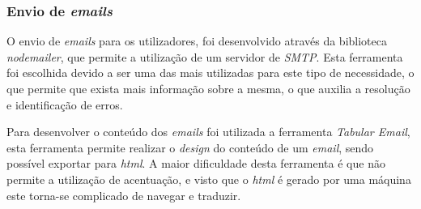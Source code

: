 \subsubsection{Envio de \textit{emails}}
O envio de \textit{emails} para os utilizadores, foi desenvolvido através da biblioteca \textit{nodemailer}, que permite a utilização de um servidor de \textit{SMTP}. Esta ferramenta foi escolhida devido a ser uma das mais utilizadas para este tipo de necessidade, o que permite que exista mais informação sobre a mesma, o que auxilia a resolução e identificação de erros. 

Para desenvolver o conteúdo dos \textit{emails} foi utilizada a ferramenta \textit{Tabular Email}, esta ferramenta permite realizar o \textit{design} do conteúdo de um \textit{email}, sendo possível exportar para \textit{html}. A maior dificuldade desta ferramenta é que não permite a utilização de acentuação, e visto que o \textit{html} é gerado por uma máquina este torna-se complicado de navegar e traduzir.